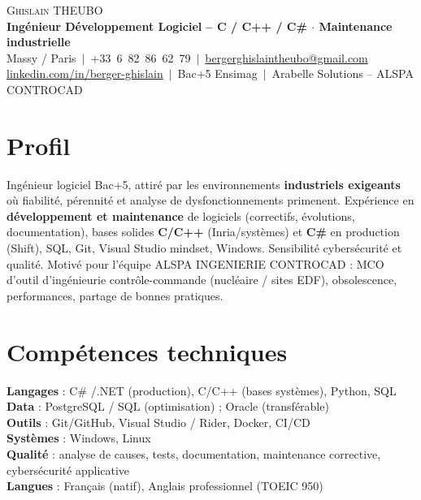 \documentclass[a4paper,10.5pt]{article}
\begin{document}
\begin{center}
{\Huge \scshape Ghislain THEUBO}\\[2pt]
\textbf{Ing\'enieur D\'eveloppement Logiciel -- C / C++ / C\# $\cdot$ Maintenance industrielle}\\[2pt]
\small Massy / Paris $\,|\,$ +33~6~82~86~62~79 $\,|\,$ \href{mailto:bergerghislaintheubo@gmail.com}{bergerghislaintheubo@gmail.com}\\[1pt]
\href{https://www.linkedin.com/in/berger-ghislain}{linkedin.com/in/berger-ghislain} $\,|\,$ Bac+5 Ensimag $\,|\,$ Arabelle Solutions -- ALSPA CONTROCAD
\end{center}

\section{Profil}
\small{
Ing\'enieur logiciel Bac+5, attir\'e par les environnements \textbf{industriels exigeants} o\`u fiabilit\'e,
p\'erennit\'e et analyse de dysfonctionnements primenent. Exp\'erience en \textbf{d\'eveloppement et maintenance}
de logiciels (correctifs, \'evolutions, documentation), bases solides \textbf{C/C++} (Inria/syst\`emes) et
\textbf{C\#} en production (Shift), SQL, Git, Visual Studio mindset, Windows. Sensibilit\'e cybers\'ecurit\'e
et qualit\'e. Motiv\'e pour l'\'equipe ALSPA INGENIERIE CONTROCAD : MCO d'outil d'ing\'enieurie
contr\^ole-commande (nucl\'eaire / sites EDF), obsolescence, performances, partage de bonnes pratiques.
}

\section{Comp\'etences techniques}
\begin{itemize}[leftmargin=0.08in,label={}]\small{\item{
\textbf{Langages} : C\# /.NET (production), C/C++ (bases syst\`emes), Python, SQL \\
\textbf{Data} : PostgreSQL / SQL (optimisation) ; Oracle (transf\'erable) \\
\textbf{Outils} : Git/GitHub, Visual Studio / Rider, Docker, CI/CD \\
\textbf{Syst\`emes} : Windows, Linux \\
\textbf{Qualit\'e} : analyse de causes, tests, documentation, maintenance corrective, cybers\'ecurit\'e applicative \\
\textbf{Langues} : Fran\c{c}ais (natif), Anglais professionnel (TOEIC 950)
}}\end{itemize}
\end{document}
